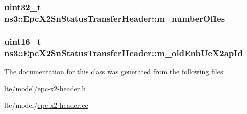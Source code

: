 \subsubsection[{\texorpdfstring{m\+\_\+number\+Of\+Ies}{m_numberOfIes}}]{\setlength{\rightskip}{0pt plus 5cm}uint32\+\_\+t ns3\+::\+Epc\+X2\+Sn\+Status\+Transfer\+Header\+::m\+\_\+number\+Of\+Ies\hspace{0.3cm}{\ttfamily [private]}}\hypertarget{classns3_1_1EpcX2SnStatusTransferHeader_ae3327053016fdbdcefb2848d64a9f672}{}\label{classns3_1_1EpcX2SnStatusTransferHeader_ae3327053016fdbdcefb2848d64a9f672}
\subsubsection[{\texorpdfstring{m\+\_\+old\+Enb\+Ue\+X2ap\+Id}{m_oldEnbUeX2apId}}]{\setlength{\rightskip}{0pt plus 5cm}uint16\+\_\+t ns3\+::\+Epc\+X2\+Sn\+Status\+Transfer\+Header\+::m\+\_\+old\+Enb\+Ue\+X2ap\+Id\hspace{0.3cm}{\ttfamily [private]}}\hypertarget{classns3_1_1EpcX2SnStatusTransferHeader_a90611f272b846cf8617cb050bf2d88db}{}\label{classns3_1_1EpcX2SnStatusTransferHeader_a90611f272b846cf8617cb050bf2d88db}


The documentation for this class was generated from the following files\+:\begin{DoxyCompactItemize}
\item 
lte/model/\hyperlink{epc-x2-header_8h}{epc-\/x2-\/header.\+h}\item 
lte/model/\hyperlink{epc-x2-header_8cc}{epc-\/x2-\/header.\+cc}\end{DoxyCompactItemize}
